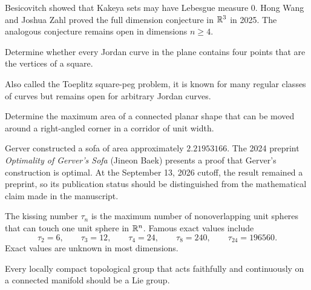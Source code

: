     \begin{remark}
        Besicovitch showed that Kakeya sets may have Lebesgue measure $0$.
        Hong Wang and Joshua Zahl proved the full dimension conjecture in
        $\mathbb{R}^3$ in 2025. The analogous conjecture remains open in dimensions
        $n\geq 4$.
    \end{remark}

    \begin{openproblem}
        Determine whether every Jordan curve in the plane contains four points
        that are the vertices of a square.
    \end{openproblem}

    \begin{remark}
        Also called the Toeplitz square-peg problem, it is known for many
        regular classes of curves but remains open for arbitrary Jordan curves.
    \end{remark}


    \begin{openproblem}
        Determine the maximum area of a connected planar shape that can be moved
        around a right-angled corner in a corridor of unit width.
    \end{openproblem}

    \begin{remark}
        Gerver constructed a sofa of area approximately $2.21953166$. The 2024
        preprint \textit{Optimality of Gerver's Sofa} (Jineon Baek) presents a
        proof that Gerver's construction is optimal. At the September 13, 2026
        cutoff, the result remained a preprint, so its publication
        status should
        be distinguished from the mathematical claim made in the manuscript.
    \end{remark}

    \begin{fact}
        The kissing number $\tau_n$ is the maximum number of nonoverlapping unit
        spheres that can touch one unit sphere in $\mathbb{R}^n$. Famous exact values
        include
        \[
            \tau_2=6,\qquad
            \tau_3=12,\qquad
            \tau_4=24,\qquad
            \tau_8=240,\qquad
            \tau_{24}=196560.
        \]
        Exact values are unknown in most dimensions.
    \end{fact}

    \begin{openproblem}
        Every locally compact topological group that acts faithfully and
        continuously on a connected manifold should be a Lie group.
    \end{openproblem}

